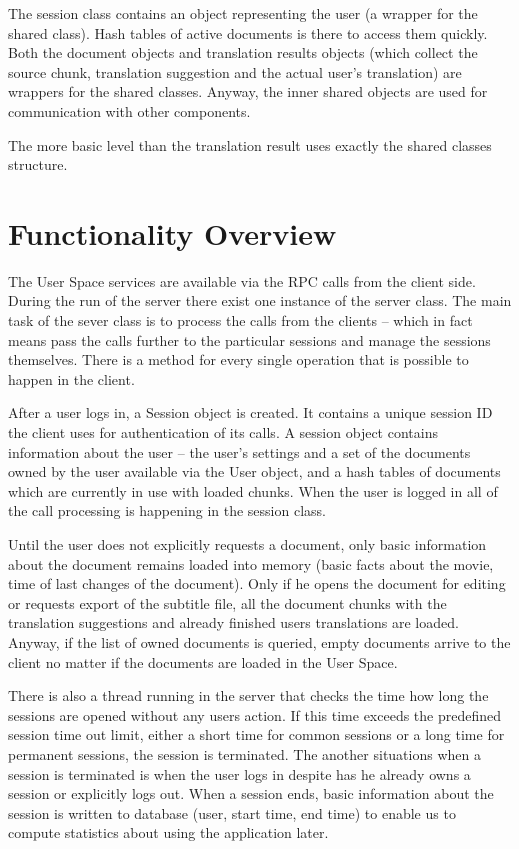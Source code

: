 The session class contains an object representing the user (a wrapper for the shared class). Hash tables of active documents is there to access  them quickly. Both the document objects and translation results objects (which collect the source chunk, translation suggestion and the actual user's translation) are wrappers for the shared classes. Anyway, the inner shared objects are used for communication with other components.

The more basic level than the translation result uses exactly the shared classes structure.

\section{Functionality Overview}

The User Space services are available via the RPC calls from the client side. During the run of the server there exist one instance of the server class. The main task of the sever class is to process the calls from the clients -- which in fact means pass the calls further to the particular sessions and manage the sessions themselves. There is a method for every single operation that is possible to happen in the client.

After a user logs in, a Session object is created. It contains a unique session ID the client uses for authentication of its calls. A session object contains information about the user -- the user's settings and a set of the documents owned by the user available via the User object, and a hash tables of documents which are currently in use with loaded chunks. When the user is logged in all of the call processing is happening in the session class.

Until the user does not explicitly requests a document, only basic information about the document remains loaded into memory (basic facts about the movie, time of last changes of the document). Only if he opens the document for editing or requests export of the subtitle file, all the document chunks with the translation suggestions and already finished users translations are loaded. Anyway, if the list of owned documents is queried, empty documents arrive to the client no matter if the documents are loaded in the User Space.

There is also a thread running in the server that checks the time how long the sessions are opened without any users action. If this time exceeds the predefined session time out limit, either a short time for common sessions or a long time for permanent sessions, the session is terminated. The another situations when a session is terminated is when the user logs in despite has he already owns a session or explicitly logs out. When a session ends, basic information about the session is written to database (user, start time, end time) to enable us to compute statistics about using the application later.

